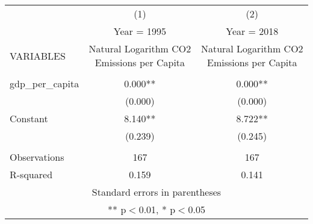 \begin{tabular}{lcc} \hline
 & (1) & (2) \\
 & Year = 1995 & Year = 2018 \\
VARIABLES & Natural Logarithm CO2 Emissions per Capita & Natural Logarithm CO2 Emissions per Capita \\ \hline
 &  &  \\
gdp\_per\_capita & 0.000** & 0.000** \\
 & (0.000) & (0.000) \\
Constant & 8.140** & 8.722** \\
 & (0.239) & (0.245) \\
 &  &  \\
Observations & 167 & 167 \\
 R-squared & 0.159 & 0.141 \\ \hline
\multicolumn{3}{c}{ Standard errors in parentheses} \\
\multicolumn{3}{c}{ ** p$<$0.01, * p$<$0.05} \\
\end{tabular}
